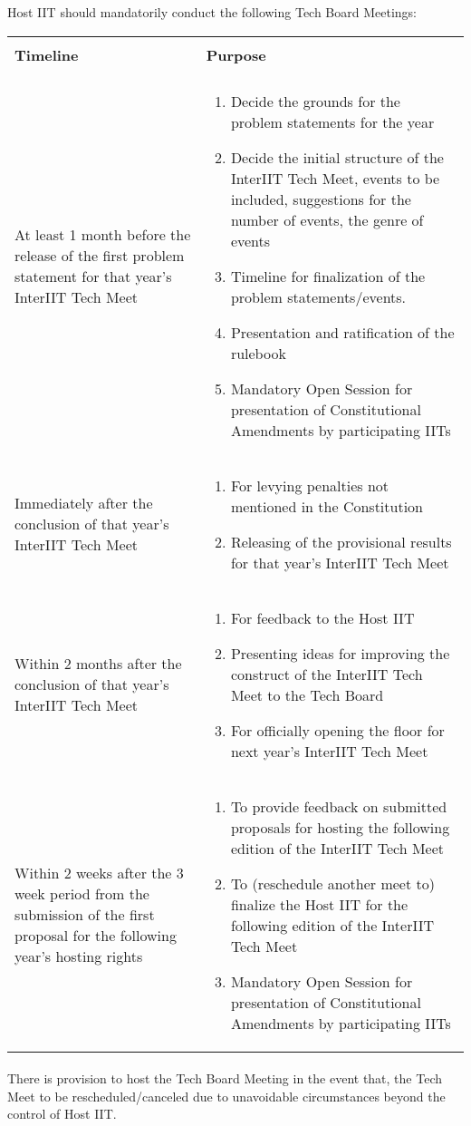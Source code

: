 Host IIT should mandatorily conduct the following Tech Board Meetings:
\newpage
\begin{center}
\renewcommand\cellgape{\Gape[2pt]} %
\begin{longtable}{m{5cm} m{10cm}}
\hline
\\[-3pt]
\textbf{Timeline} & \textbf{Purpose}\\[4pt]
\hline
\\[-1pt]
At least 1 month before the release of the first problem statement for that year’s InterIIT Tech Meet &
\begin{enumerate}
    \item Decide the grounds for the problem statements for the year
    \item Decide the initial structure of the InterIIT Tech Meet, events to be included, suggestions for the number of events, the genre of events
    \item Timeline for finalization of the problem statements/events.
    \item Presentation and ratification of the rulebook
    \item Mandatory Open Session for presentation of Constitutional Amendments by participating IITs
\end{enumerate}
\\
\hline
Immediately after the conclusion of that year’s InterIIT Tech Meet &
\begin{enumerate}
    \item For levying penalties not mentioned in the Constitution
    \item Releasing of the provisional results for that year’s InterIIT Tech Meet
\end{enumerate}
\\
\hline
Within 2 months after the conclusion of that year’s InterIIT Tech Meet &
\begin{enumerate}
    \item For feedback to the Host IIT
    \item Presenting ideas for improving the construct of the InterIIT Tech Meet to the Tech Board
    \item For officially opening the floor for next year’s InterIIT Tech Meet
\end{enumerate}
\\
\hline
Within 2 weeks after the 3 week period from the submission of the first proposal for the following year’s hosting rights &
\begin{enumerate}
    \item To provide feedback on submitted proposals for hosting the following edition of the InterIIT Tech Meet
    \item To (reschedule another meet to) finalize the Host IIT for the following edition of the InterIIT Tech Meet
    \item Mandatory Open Session for presentation of Constitutional Amendments by participating IITs

\end{enumerate}
\hline
\end{longtable}
\end{center}




\paragraph{}
There is provision to host the Tech Board Meeting in the event that, the Tech Meet to be rescheduled/canceled due to unavoidable circumstances beyond the control of Host IIT.